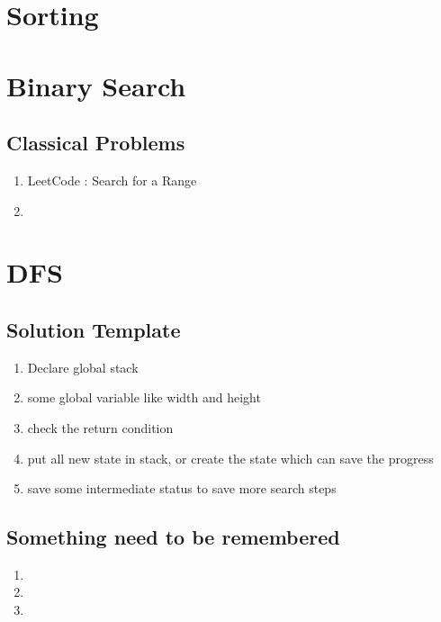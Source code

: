 \chapter{ Sorting }

\chapter{ Binary Search }

\section{ Classical  Problems }

 \begin{enumerate}
    \item  LeetCode : Search for a Range

    \item

\end{enumerate}

\chapter{ DFS }


\section{ Solution Template }

 \begin{enumerate}
    \item  Declare global stack

    \item  some global variable like width and height

    \item  check the return condition

    \item  put all new state in stack, or create the state which can save the progress

    \item save some intermediate status to save more search steps

\end{enumerate}

\section{ Something need to be remembered }

\begin{enumerate}
    \item
    \item
    \item

\end{enumerate}


